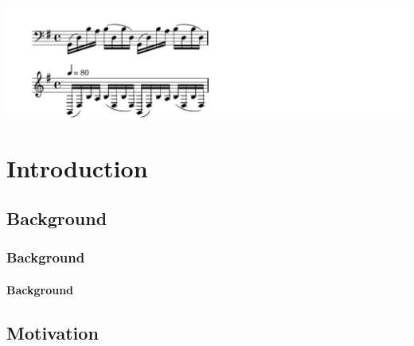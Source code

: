 \begin{savequote}[10pc]
{%
\parindent 0pt
\ifx\preLilyPondExample \undefined
\else
  \expandafter\preLilyPondExample
\fi
\def\lilypondbook{}%
\includegraphics[width=3.5\textwidth]{images/bachPrelude}
\ifx\postLilyPondExample \undefined
\else
  \expandafter\postLilyPondExample
\fi
}
\end{savequote}
\chapter{Introduction}
\minitoc


\section{Background}
\subsection{Background}
\subsubsection{Background}


\section{Motivation}

